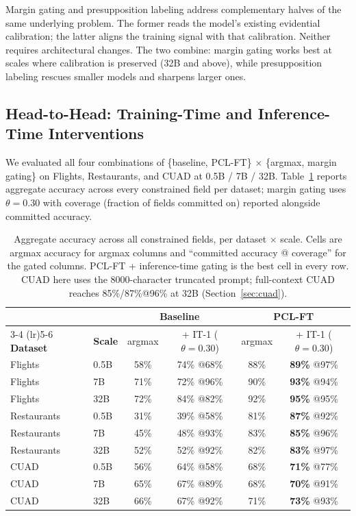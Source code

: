 \documentclass[11pt]{article}
\begin{document}
Margin gating and presupposition labeling address complementary halves of the same underlying problem. The former reads the model's existing evidential calibration; the latter aligns the training signal with that calibration. Neither requires architectural changes. The two combine: margin gating works best at scales where calibration is preserved (32B and above), while presupposition labeling rescues smaller models and sharpens larger ones.

\subsection{Head-to-Head: Training-Time and Inference-Time Interventions}\label{sec:head_to_head}

We evaluated all four combinations of \{baseline, PCL-FT\} $\times$ \{argmax, margin gating\} on Flights, Restaurants, and CUAD at 0.5B / 7B / 32B. Table~\ref{tab:head_to_head} reports aggregate accuracy across every constrained field per dataset; margin gating uses $\theta = 0.30$ with coverage (fraction of fields committed on) reported alongside committed accuracy.

\begin{table}[t]
\centering
\small
\begin{tabular}{llcccc}
\toprule
 &  & \multicolumn{2}{c}{\textbf{Baseline}} & \multicolumn{2}{c}{\textbf{PCL-FT}} \\
\cmidrule(lr){3-4} \cmidrule(lr){5-6}
\textbf{Dataset} & \textbf{Scale} & argmax & + IT-1 ($\theta{=}0.30$) & argmax & + IT-1 ($\theta{=}0.30$) \\
\midrule
Flights     & 0.5B & 58\% & 74\% @68\%     & 88\% & \textbf{89\%} @97\% \\
Flights     & 7B   & 71\% & 72\% @96\%     & 90\% & \textbf{93\%} @94\% \\
Flights     & 32B  & 72\% & 84\% @82\%     & 92\% & \textbf{95\%} @95\% \\
\midrule
Restaurants & 0.5B & 31\% & 39\% @58\%     & 81\% & \textbf{87\%} @92\% \\
Restaurants & 7B   & 45\% & 48\% @93\%     & 83\% & \textbf{85\%} @96\% \\
Restaurants & 32B  & 52\% & 52\% @92\%     & 82\% & \textbf{83\%} @97\% \\
\midrule
CUAD        & 0.5B & 56\% & 64\% @58\%     & 68\% & \textbf{71\%} @77\% \\
CUAD        & 7B   & 65\% & 67\% @89\%     & 68\% & \textbf{70\%} @91\% \\
CUAD        & 32B  & 66\% & 67\% @92\%     & 71\% & \textbf{73\%} @93\% \\
\bottomrule
\end{tabular}
\caption{Aggregate accuracy across all constrained fields, per dataset $\times$ scale. Cells are argmax accuracy for argmax columns and ``committed accuracy @ coverage'' for the gated columns. PCL-FT + inference-time gating is the best cell in every row. CUAD here uses the 8000-character truncated prompt; full-context CUAD reaches 85\%/87\%@96\% at 32B (Section~\ref{sec:cuad}).}
\label{tab:head_to_head}
\end{table}
\end{document}

